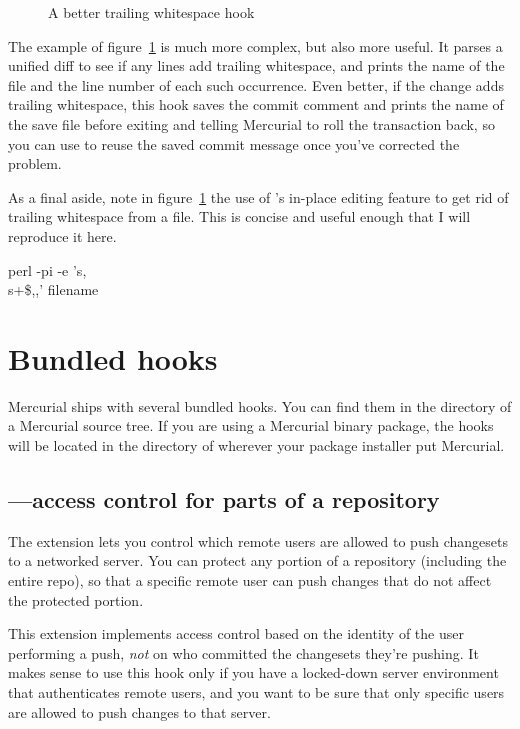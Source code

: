\begin{figure}[ht]
  \caption{A better trailing whitespace hook}
  \label{ex:hook:ws.better}
\end{figure}

The example of figure~\ref{ex:hook:ws.better} is much more complex,
but also more useful.  It parses a unified diff to see if any lines
add trailing whitespace, and prints the name of the file and the line
number of each such occurrence.  Even better, if the change adds
trailing whitespace, this hook saves the commit comment and prints the
name of the save file before exiting and telling Mercurial to roll the
transaction back, so you can use
 to reuse the
saved commit message once you've corrected the problem.

As a final aside, note in figure~\ref{ex:hook:ws.better} the use of
's in-place editing feature to get rid of trailing
whitespace from a file.  This is concise and useful enough that I will
reproduce it here.
\begin{codesample2}
  perl -pi -e 's,\\s+\$,,' filename
\end{codesample2}

\section{Bundled hooks}

Mercurial ships with several bundled hooks.  You can find them in the
 directory of a Mercurial source tree.  If you are
using a Mercurial binary package, the hooks will be located in the
 directory of wherever your package installer put
Mercurial.

\subsection{---access control for parts of a repository}

The  extension lets you control which remote users are
allowed to push changesets to a networked server.  You can protect any
portion of a repository (including the entire repo), so that a
specific remote user can push changes that do not affect the protected
portion.

This extension implements access control based on the identity of the
user performing a push, \emph{not} on who committed the changesets
they're pushing.  It makes sense to use this hook only if you have a
locked-down server environment that authenticates remote users, and
you want to be sure that only specific users are allowed to push
changes to that server.

